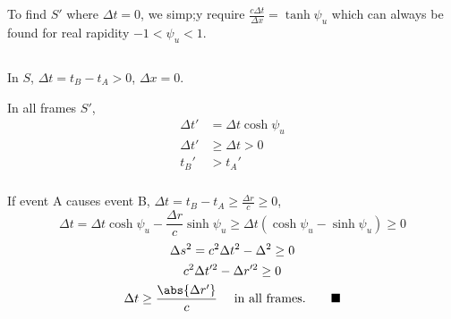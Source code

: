\documentclass[12pt]{article}
\begin{document}
            To find $S'$ where $\Delta t=0$, we simp;y require $\frac{c\Delta t}{\Delta x}=\tanh \psi_u$ which can always be found for real rapidity $-1<\psi_u<1$. 
        \subsection{} 
            \subsubsection{} In $S$, \( \Delta t = t_B - t_A > 0\), \(\Delta x = 0\).
            
            In all frames $S'$,
            \begin{align*}
                \Delta t' &= \Delta t \cosh \psi_u\\
                \Delta t' &\geq \Delta t > 0\\
                t_B' &> t_A'
            \end{align*}
            \subsubsection{} If event A causes event B, \( \Delta t = t_B - t_A \geq \frac{\Delta r}{c} \geq 0 \),
            \[\Delta t = \Delta t \cosh \psi_u -\frac{\Delta r}{c}\sinh \psi_u\geq \Delta t(\cosh \psi_u - \sinh \psi_u)\geq 0 \]
            \begin{gather*}
                \Delta s^2 = c^2 \Delta t^2 - \Delta^2 \geq 0\\
                c^2 \Delta t'^2 - \Delta r'^2\geq 0\\
                \Delta t \geq \frac{\abs{\Delta r'}}{c}\quad \text{ in all frames.}\qquad\blacksquare
            \end{gather*}
        \subsection{} 
\end{document}
